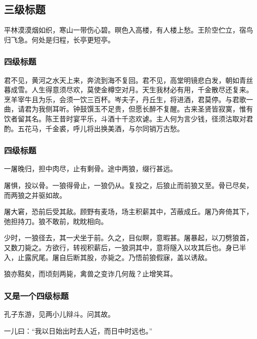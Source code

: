 \documentclass[
    doctor,
    pdflinks,
    ]{xjtuthesis}
\begin{document}
            \subsection{三级标题}

            平林漠漠烟如织，寒山一带伤心碧。暝色入高楼，有人楼上愁。王阶空伫立，宿鸟归飞急。何处是归程，长亭更短亭。

                \subsubsection{四级标题}
                    
                君不见，黄河之水天上来，奔流到海不复回。君不见，高堂明镜悲白发，朝如青丝暮成雪。人生得意须尽欢，莫使金樽空对月。天生我材必有用，千金散尽还复来。烹羊宰牛且为乐，会须一饮三百杯。岑夫子，丹丘生，将进酒，君莫停。与君歌一曲，请君为我侧耳听。钟鼓馔玉不足贵，但愿长醉不复醒。古来圣贤皆寂寞，惟有饮者留其名。陈王昔时宴平乐，斗酒十千恣欢谑。主人何为言少钱，径须沽取对君酌。五花马，千金裘，呼儿将出换美酒，与尔同销万古愁。

                \subsubsection{四级标题}

                    一屠晚归，担中肉尽，止有剩骨。途中两狼，缀行甚远。

                    屠惧，投以骨。一狼得骨止，一狼仍从。复投之，后狼止而前狼又至。骨已尽矣，而两狼之并驱如故。

                    屠大窘，恐前后受其敌。顾野有麦场，场主积薪其中，苫蔽成丘。屠乃奔倚其下，弛担持刀。狼不敢前，眈眈相向。

                    少时，一狼径去，其一犬坐于前。久之，目似瞑，意暇甚。屠暴起，以刀劈狼首，又数刀毙之。方欲行，转视积薪后，一狼洞其中，意将隧入以攻其后也。身已半入，止露尻尾。屠自后断其股，亦毙之。乃悟前狼假寐，盖以诱敌。

                    狼亦黠矣，而顷刻两毙，禽兽之变诈几何哉？止增笑耳。

                \subsubsection{又是一个四级标题}

                    孔子东游，见两小儿辩斗。问其故。

                    一儿曰：“我以日始出时去人近，而日中时远也。”
\end{document}
